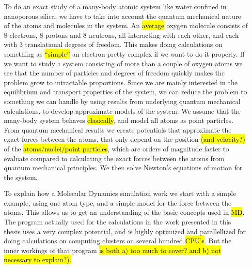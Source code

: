 To do an exact study of a many-body atomic system like water confined in nanoporous silica, we have to take into account the quantum mechanical nature of the atoms and molecules in the system. An \hl{average} oxygen molecule consists of 8 electrons, 8 protons and 8 neutrons, all interacting with each other, and each with 3 translational degrees of freedom. This makes doing calculations on something as \hl{``simple''} an electron pretty complex if we want to do it properly. If we want to study a system consisting of more than a couple of oxygen atoms we see that the number of particles and degrees of freedom quickly makes the problem grow to intractable proportions. Since we are mainly interested in the equilibrium and transport properties of the system, we can reduce the problem to something we can handle by using results from underlying quantum mechanical calculations, to develop approximate models of the system. We assume that the many-body system behaves \hl{clasically}, and model all atoms as point particles. From quantum mechanical results we create potentials that approximate the exact forces between the atoms, that only depend on the position \hl{(and velocity?)} of the \hl{atoms/nuclei/point particles}, which are orders of magnitude faster to evaluate compared to calculating the exact forces between the atoms from quantum mechanical principles. We then solve Newton's equations of motion for the system.

To explain how a Molecular Dynamics simulation work we start with a simple example, using one atom type, and a simple model for the force between the atoms. This allows us to get an understanding of the basic concepts used in \hl{MD}. The program actually used for the calculations in the work presented in this thesis uses a very complex potential, and is highly optimized and parallellized for doing calculations on computing clusters on several hundred \hl{CPU's}. But the inner workings of that program \hl{is both a) too much to cover? and b) not necessary to explain?).}

    


